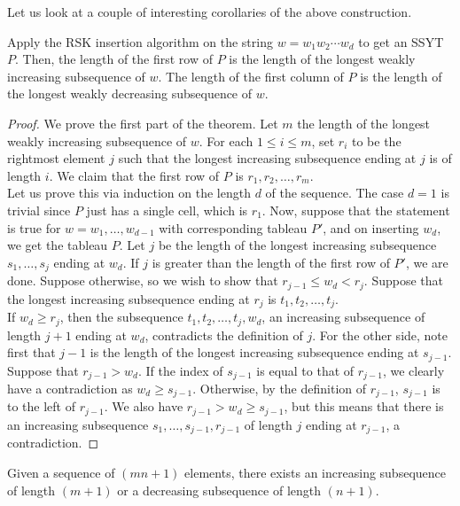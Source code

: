 	Let us look at a couple of interesting corollaries of the above construction.
	\begin{ftheo}[Schensted]
		Apply the RSK insertion algorithm on the string $w = w_1w_2\cdots w_d$ to get an SSYT $P$. Then, the length of the first row of $P$ is the length of the longest weakly increasing subsequence of $w$. The length of the first column of $P$ is the length of the longest weakly decreasing subsequence of $w$.
	\end{ftheo}
	\begin{proof}
		We prove the first part of the theorem. Let $m$ the length of the longest weakly increasing subsequence of $w$. For each $1 \le i \le m$, set $r_i$ to be the rightmost element $j$ such that the longest increasing subsequence ending at $j$ is of length $i$. We claim that the first row of $P$ is $r_1,r_2,\ldots,r_m$.\\
		Let us prove this via induction on the length $d$ of the sequence. The case $d = 1$ is trivial since $P$ just has a single cell, which is $r_1$. Now, suppose that the statement is true for $w = w_1,\ldots,w_{d-1}$ with corresponding tableau $P'$, and on inserting $w_d$, we get the tableau $P$. Let $j$ be the length of the longest increasing subsequence $s_{1},\ldots,s_{j}$ ending at $w_d$. If $j$ is greater than the length of the first row of $P'$, we are done. Suppose otherwise, so we wish to show that $r_{j-1} \le w_d < r_j$. Suppose that the longest increasing subsequence ending at $r_j$ is $t_1,t_2,\ldots,t_j$.\\
		If $w_d \ge r_j$, then the subsequence $t_1,t_2,\ldots,t_j,w_d$, an increasing subsequence of length $j+1$ ending at $w_d$, contradicts the definition of $j$. For the other side, note first that $j-1$ is the length of the longest increasing subsequence ending at $s_{j-1}$. Suppose that $r_{j-1} > w_d$. If the index of $s_{j-1}$ is equal to that of $r_{j-1}$, we clearly have a contradiction as $w_d \ge s_{j-1}$. Otherwise, by the definition of $r_{j-1}$, $s_{j-1}$ is to the left of $r_{j-1}$. We also have $r_{j-1} > w_d \ge s_{j-1}$, but this means that there is an increasing subsequence $s_1,\ldots,s_{j-1},r_{j-1}$ of length $j$ ending at $r_{j-1}$, a contradiction.
	\end{proof}

	\begin{fcor}
		Given a sequence of $(mn+1)$ elements, there exists an increasing subsequence of length $(m+1)$ or a decreasing subsequence of length $(n+1)$.
	\end{fcor}

